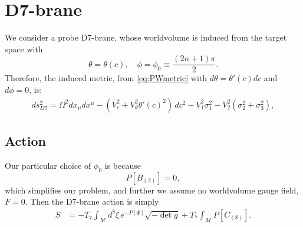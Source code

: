 \section{D7-brane}

We consider a probe D7-brane, whose worldvolume is induced from the target space with 
\begin{equation}\label{eq:ansatz}
 \theta = \theta(c), \quad \phi=\phi_0\equiv\frac{(2 n + 1)\pi}{2}.
\end{equation}
Therefore, the induced metric, from \eqref{eq:PWmetric} with $d\theta = \theta'(c) dc$ and $d\phi=0$, is:
\begin{align}\label{eq:PWmetric}
ds_{D7}^2 =
\Omega^2 dx_\mu dx^\mu 
- (V_c^2 +V_\theta^2 \theta'(c)^2)\, dc^2 - V_1^2 \sigma_1^2 - V_2^2 (\sigma_2^2 + \sigma_3^2),
\end{align}



\subsection{Action}

Our particular choice of $\phi_0$ is because
\begin{equation}
 P[B_{(2)}] = 0,
\end{equation}
which simplifies our problem, and further we assume no worldvolume gauge field, $F = 0$. 
Then the D7-brane action is simply
\begin{align}
 S & = -T_7 \int_\mathcal{M} d^8\xi \, e^{-P[\Phi] } \sqrt{-\det g} +
 T_7\int _\mathcal{M} P[C_{(8)}].
\end{align}

